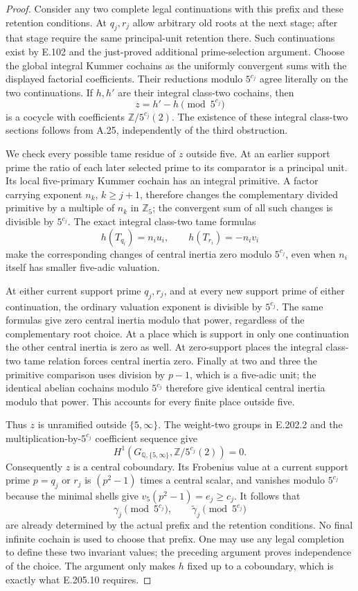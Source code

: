 \begin{proof}
Consider any two complete legal continuations with this prefix
and these retention conditions.  At $q_j,r_j$ allow arbitrary
old roots at the next stage; after that stage require the same
principal-unit retention there.  Such continuations exist by
E.102 and the just-proved additional prime-selection argument.
Choose the global integral Kummer cochains as the uniformly
convergent sums with the displayed factorial coefficients.
Their reductions modulo $5^{c_j}$ agree literally on the two
continuations.  If $h,h'$ are their integral class-two
cochains, then
\[
                  z=h'-h\pmod{5^{c_j}}
 \tag{E.205.7}
\]
is a cocycle with coefficients $\mathbb Z/5^{c_j}(2)$.
The existence of these integral class-two sections follows
from A.25, independently of the third obstruction.

We check every possible tame residue of $z$ outside five.
At an earlier support prime the ratio of each later selected
prime to its comparator is a principal unit.  Its local
five-primary Kummer cochain has an integral primitive.  A
factor carrying exponent $n_k$, $k\geq j+1$, therefore
changes the complementary divided primitive by a multiple
of $n_k$ in $\mathbb Z_5$; the convergent sum of all such
changes is divisible by $5^{c_j}$.  The exact integral
class-two tame formulas
\[
            h(T_{q_i})=n_i u_i,\qquad
            h(T_{r_i})=-n_i v_i
 \tag{E.205.8}
\]
make the corresponding changes of central inertia zero
modulo $5^{c_j}$, even when $n_i$ itself has smaller
five-adic valuation.

At either current support prime $q_j,r_j$, and at every
new support prime of either continuation, the ordinary
valuation exponent is divisible by $5^{c_j}$.  The same
formulas give zero central inertia modulo that power,
regardless of the complementary root choice.  At a place
which is support in only one continuation the other
central inertia is zero as well.  At zero-support places
the integral class-two tame relation forces central
inertia zero.  Finally at two and three the primitive
comparison uses division by $p-1$, which is a five-adic
unit; the identical abelian cochains modulo $5^{c_j}$
therefore give identical central inertia modulo that
power.  This accounts for every finite place outside five.

Thus $z$ is unramified outside $\{5,\infty\}$.  The
weight-two groups in E.202.2 and the multiplication-by-$5^{c_j}$
coefficient sequence give
\[
 H^1(G_{\mathbb Q,\{5,\infty\}},\mathbb Z/5^{c_j}(2))=0.
 \tag{E.205.9}
\]
Consequently $z$ is a central coboundary.  Its Frobenius
value at a current support prime $p=q_j$ or $r_j$ is
$(p^2-1)$ times a central scalar, and vanishes modulo
$5^{c_j}$ because the minimal shells give
$v_5(p^2-1)=e_j\geq c_j$.
It follows that
\[
       \gamma_j\pmod{5^{c_j}},\qquad
       \widetilde\gamma_j\pmod{5^{c_j}}
 \tag{E.205.10}
\]
are already determined by the actual prefix and the
retention conditions.  No final infinite cochain is used
to choose that prefix.  One may use any legal completion
to define these two invariant values; the preceding
argument proves independence of the choice.  The argument
only makes $h$ fixed up to a coboundary, which is exactly
what E.205.10 requires.


\end{proof}
